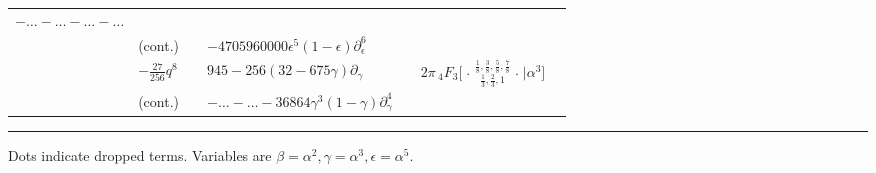 \documentclass[nofootinbib,preprint]{revtex4-1}
\begin{document}
\begin{table}[t]
\begin{center}
{\begin{tabularx}{\textwidth}{ c l | c l | c l | c }
$-\ldots - \ldots - \ldots - \ldots $
  & & &     \\
& \;\;\;\tiny(cont.)  & & \hspace{1.0cm}
$ - 4705960000\epsilon^5 (1 - \epsilon)\partial_{\epsilon}^6 $
  & & &     \\
& $-\frac{27}{256}q^8$  & &
 $945 -256 (32 - 675 \gamma)\partial_{\gamma} $ & &
$2\pi\,_4F_3 \Big[ \genfrac..{0pt}{}{
\frac{1}{8},\frac{3}{8},\frac{5}{8},\frac{7}{8}
}{\frac{1}{3},\frac{2}{3},1}\Big| \alpha^3 \Big]$     \\
& \;\;\;\tiny(cont.)  & & \hspace{0.5cm}
$-\ldots - \ldots - 36864 \gamma^3 (1 - \gamma)\partial_{\gamma}^4  $
  & & &     \\
\end{tabularx}}
\rule{\textwidth}{.01cm}
Dots indicate dropped terms. Variables are $\beta=\alpha^2, \gamma=\alpha^3, \epsilon=\alpha^5$. 
\end{center}
\end{table}
\end{document}
